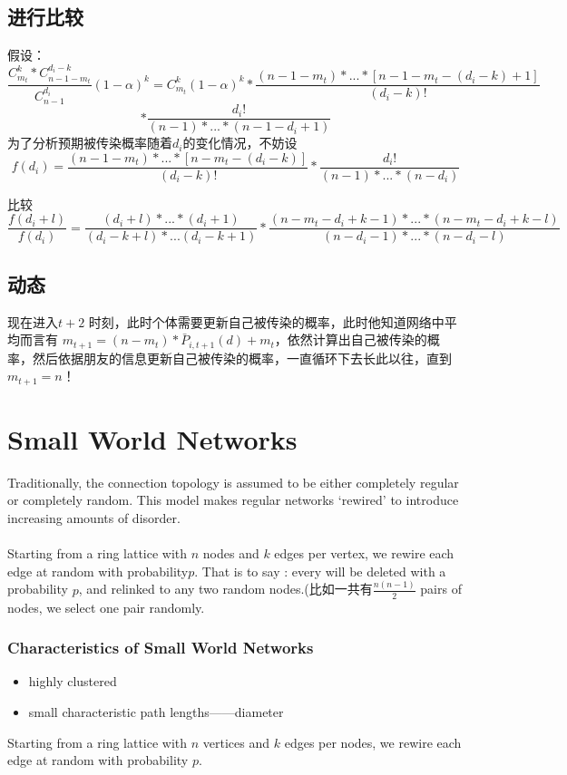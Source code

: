 \documentclass[a4paper]{article}
\begin{document}
\subsection{进行比较}
假设：
\[ \frac{C_{m_t}^{k}*C_{n-1-m_t}^{d_i-k}}  {C_{n-1}^{d_i}}(1-\alpha)^k=C_{m_t}^{k}(1-\alpha)^k*\frac{(n-1-m_t)*...*[n-1-m_t-(d_i-k)+1]}{(d_i-k)!} \]
\[*\frac{d_i!}{(n-1)*...*(n-1-d_i+1)}\]
为了分析预期被传染概率随着$d_i$的变化情况，不妨设
\[f(d_i)= \frac{(n-1-m_t)*...*[n-m_t-(d_i-k)]}{(d_i-k)!}* \frac{d_i!}{(n-1)*...*(n-d_i)}\]

比较\[\frac{f(d_i+l)}{f(d_i)}=\frac{(d_i+l)*...*(d_i+1)}{(d_i-k+l)*...(d_i-k+1)}  *
\frac{(n-m_t-d_i+k-1)*...*(n-m_t-d_i+k-l)}{(n-d_i-1)*...*(n-d_i-l)}     \]


\subsection{动态}
现在进入$t+2$ 时刻，此时个体需要更新自己被传染的概率，此时他知道网络中平均而言有
$ m_{t+1}=(n-m_t)*\bar{P}_{i,t+1}(d)  +m_t $，依然计算出自己被传染的概率，然后依据朋友的信息更新自己被传染的概率，一直循环下去长此以往，直到$m_{t+1}=n$！

\section{Small World Networks}
Traditionally, the connection topology is assumed to be either completely regular or completely random.
This model makes regular networks ‘rewired’ to introduce
increasing amounts of disorder.
\paragraph{}
Starting from a ring lattice with $n$ nodes and $k$ edges per vertex, we rewire each edge at random with probability$p$. That is to say : every will be deleted with a probability $p$, and relinked to any two random nodes.(比如一共有$\frac{n(n-1)}{2}$ pairs of nodes, we select one pair randomly.



\subsubsection{Characteristics of Small World Networks}
\begin{itemize}
	\item highly clustered
	\item small characteristic path lengths——diameter
	
\end{itemize}
Starting from a ring lattice with $n$ vertices and $k$ edges per nodes, we rewire each edge at random with probability $p$.
\end{document}
